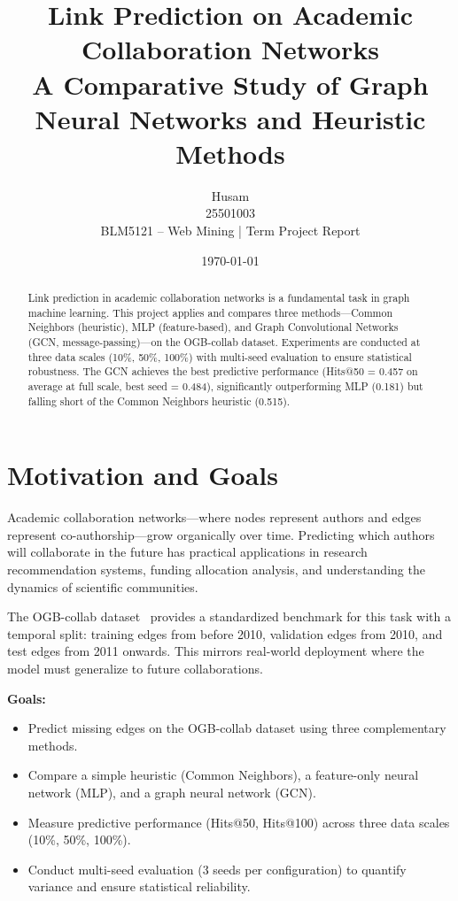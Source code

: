 \documentclass[12pt,a4paper]{article}
\title{\textbf{Link Prediction on Academic Collaboration Networks}\\
       \large A Comparative Study of Graph Neural Networks and Heuristic Methods}
\author{Husam \\ 25501003 \\
        BLM5121 – Web Mining | Term Project Report}
\date{\today}
\begin{document}
\maketitle
\thispagestyle{empty}

\begin{abstract}
Link prediction in academic collaboration networks is a fundamental task in graph machine learning. This project applies and compares three methods—Common Neighbors (heuristic), MLP (feature-based), and Graph Convolutional Networks (GCN, message-passing)—on the OGB-collab dataset. Experiments are conducted at three data scales (10\%, 50\%, 100\%) with multi-seed evaluation to ensure statistical robustness. The GCN achieves the best predictive performance (Hits@50 = 0.457 on average at full scale, best seed = 0.484), significantly outperforming MLP (0.181) but falling short of the Common Neighbors heuristic (0.515).
\end{abstract}

\section{Motivation and Goals}

Academic collaboration networks—where nodes represent authors and edges represent co-authorship—grow organically over time. Predicting which authors will collaborate in the future has practical applications in research recommendation systems, funding allocation analysis, and understanding the dynamics of scientific communities.

The OGB-collab dataset~\cite{ogb} provides a standardized benchmark for this task with a temporal split: training edges from before 2010, validation edges from 2010, and test edges from 2011 onwards. This mirrors real-world deployment where the model must generalize to future collaborations.

\textbf{Goals:}
\begin{itemize}[nosep]
    \item Predict missing edges on the OGB-collab dataset using three complementary methods.
    \item Compare a simple heuristic (Common Neighbors), a feature-only neural network (MLP), and a graph neural network (GCN).
    \item Measure predictive performance (Hits@50, Hits@100) across three data scales (10\%, 50\%, 100\%).
    \item Conduct multi-seed evaluation (3 seeds per configuration) to quantify variance and ensure statistical reliability.
\end{itemize}
\end{document}
